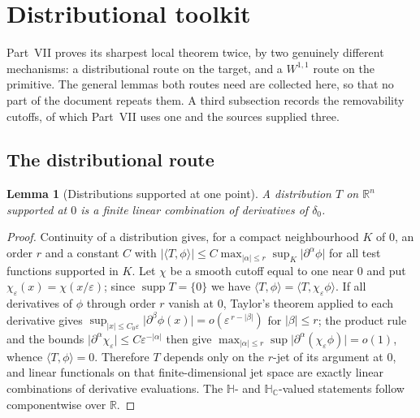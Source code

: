 \documentclass[11pt,a4paper]{article}
\numberwithin{equation}{section}
\newtheorem{lemma}[theorem]{Lemma}
\theoremstyle{definition}
\theoremstyle{remark}
\theoremstyle{plain}
\newcommand{\HH}{\mathbb H}
\newcommand{\HC}{\mathbb H_{\mathbb C}}
\newcommand{\RR}{\mathbb R}
\newcommand{\abs}[1]{\lvert #1\rvert}
\begin{document}
\appendix

\section{Distributional toolkit}
\label{f:app:distributions}

Part~VII proves its sharpest local theorem twice, by two genuinely
different mechanisms: a distributional route on the target, and a
$W^{1,1}$ route on the primitive. The general lemmas both routes need are
collected here, so that no part of the document repeats them. A third
subsection records the removability cutoffs, of which Part~VII uses one and
the sources supplied three.

\subsection{The distributional route}
\label{f:sub:pointmass}

\begin{lemma}[Distributions supported at one point]
\label{f:lem:point-support}
A distribution $T$ on $\RR^n$ supported at $0$ is a finite linear
combination of derivatives of $\delta_0$.
\end{lemma}
\begin{proof}
Continuity of a distribution gives, for a compact neighbourhood $K$ of $0$,
an order $r$ and a constant $C$ with
$\abs{\langle T,\phi\rangle}\le
C\max_{\abs\alpha\le r}\sup_K\abs{\partial^\alpha\phi}$
for all test functions supported in $K$. Let $\chi$ be a smooth cutoff
equal to one near $0$ and put $\chi_\varepsilon(x)=\chi(x/\varepsilon)$;
since $\operatorname{supp}T=\{0\}$ we have
$\langle T,\phi\rangle=\langle T,\chi_\varepsilon\phi\rangle$.
If all derivatives of $\phi$ through order $r$ vanish at $0$, Taylor's
theorem applied to each derivative gives
$\sup_{\abs x\le C_0\varepsilon}\abs{\partial^\beta\phi(x)}
=o(\varepsilon^{\,r-\abs\beta})$ for $\abs\beta\le r$; the product rule and
the bounds $\abs{\partial^\alpha\chi_\varepsilon}\le
C\varepsilon^{-\abs\alpha}$ then give
$\max_{\abs\alpha\le r}\sup\abs{\partial^\alpha(\chi_\varepsilon\phi)}
=o(1)$, whence $\langle T,\phi\rangle=0$. Therefore $T$ depends only on
the $r$-jet of its argument at $0$, and linear functionals on that
finite-dimensional jet space are exactly linear combinations of derivative
evaluations. The $\HH$- and $\HC$-valued statements follow componentwise
over $\RR$.
\end{proof}
\end{document}
